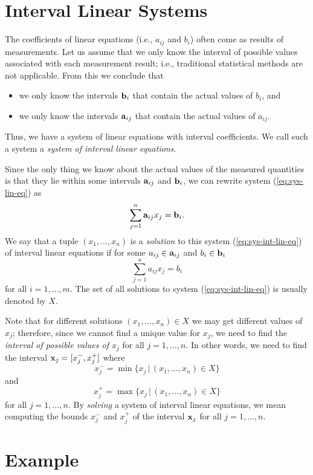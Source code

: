 \section{Interval Linear Systems}

The coefficients of linear equations (i.e., $a_{ij}$ and $b_i$) often come 
as results of measurements.  Let us assume that we only know the interval
of possible values associated with each measurement result; i.e., traditional
statistical methods are not applicable. From this we conclude that
\begin{itemize}
\item we only know the intervals ${\bf b}_i$ that contain the actual values
      of $b_i$, and
\item we only know the intervals ${\bf a}_{ij}$ that contain the actual
      values of $a_{ij}$.
\end{itemize}
Thus, we have a system of linear equations with interval coefficients.
We call such a system a {\em system of interval linear equations}.

Since the only thing we know about the actual
values of the measured quantities
is that they lie within some intervals ${\bf a}_{ij}$ and ${\bf b}_i$,
we can rewrite system (\ref{eq:sys-lin-eq}) as
\begin{equation}
  \sum_{j=1}^n {\bf a}_{ij}x_j={\bf b}_i.         \label{eq:sys-int-lin-eq}
\end{equation}
We say that a tuple $(x_1,\ldots,x_n)$ is a {\em solution\/} to this system
(\ref{eq:sys-int-lin-eq}) of interval linear equations if for some
$a_{ij}\in {\bf a}_{ij}$ and $b_i\in {\bf b}_i$
$$
  \sum_{j=1}^n a_{ij}x_j=b_i
$$
for all $i=1,\ldots,m$.  The set of all solutions to system
(\ref{eq:sys-int-lin-eq}) is usually denoted by $X$.

Note that for different solutions $(x_1,\ldots,x_n)\in X$ we may get different
values of $x_j$; therefore, since we cannot find a unique value for $x_j$, we
need to find the {\em interval of possible values of $x_j$} for all
$j=1,\ldots,n$.  In other words, we need to find the interval
${\bf x}_j=[x^-_j,x^+_j]$ where
$$
  x^-_j=\min\{x_j\,|\,(x_1,\ldots,x_n)\in X\}
$$
and
$$
  x^+_j=\max\{x_j\,|\,(x_1,\ldots,x_n)\in X\}
$$
for all $j=1,\ldots,n$.
By {\em solving\/} a system of interval linear equations, we mean
computing the bounds $x_j^-$ and $x_j^+$ of the interval ${\bf x}_j$
for all $j=1,\ldots,n$.

\section{Example}


